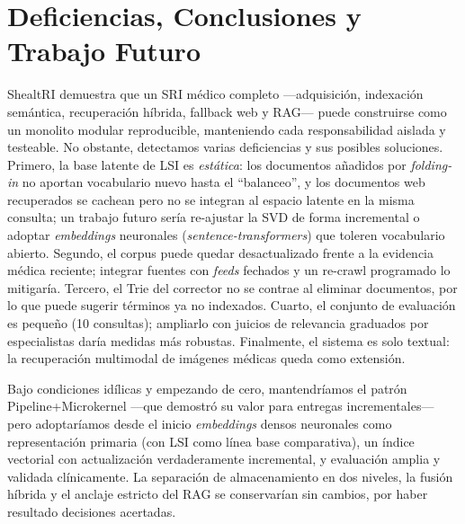 \documentclass[runningheads,a4paper,14pts]{llncs}
\begin{document}
	\section{Deficiencias, Conclusiones y Trabajo Futuro}\label{sec:conclusiones}
	
	ShealtRI demuestra que un SRI médico completo ---adquisición, indexación
	semántica, recuperación híbrida, fallback web y RAG--- puede construirse como un
	monolito modular reproducible, manteniendo cada responsabilidad aislada y
	testeable. No obstante, detectamos varias deficiencias y sus posibles soluciones.
	Primero, la base latente de LSI es \emph{estática}: los documentos añadidos por
	\emph{folding-in} no aportan vocabulario nuevo hasta el ``balanceo'', y los
	documentos web recuperados se cachean pero no se integran al espacio
	latente en la misma consulta; un trabajo futuro sería re-ajustar la SVD de forma
	incremental o adoptar \emph{embeddings} neuronales (\emph{sentence-transformers})
	que toleren vocabulario abierto. Segundo, el corpus puede quedar
	desactualizado frente a la evidencia médica reciente; integrar fuentes con
	\emph{feeds} fechados y un re-crawl programado lo mitigaría. Tercero, el Trie del
	corrector no se contrae al eliminar documentos, por lo que puede sugerir términos
	ya no indexados. Cuarto, el conjunto de evaluación es pequeño (10 consultas);
	ampliarlo con juicios de relevancia graduados por especialistas daría medidas más
	robustas. Finalmente, el sistema es solo textual: la recuperación multimodal de
	imágenes médicas queda como extensión.
	
	Bajo condiciones idílicas y empezando de cero, mantendríamos el patrón
	Pipeline+Microkernel ---que demostró su valor para entregas incrementales--- pero
	adoptaríamos desde el inicio \emph{embeddings} densos neuronales como
	representación primaria (con LSI como línea base comparativa), un índice vectorial
	con actualización verdaderamente incremental, y evaluación amplia y
	validada clínicamente. La separación de almacenamiento en dos niveles, la fusión
	híbrida y el anclaje estricto del RAG se conservarían sin cambios, por haber
	resultado decisiones acertadas.
	
\end{document}
